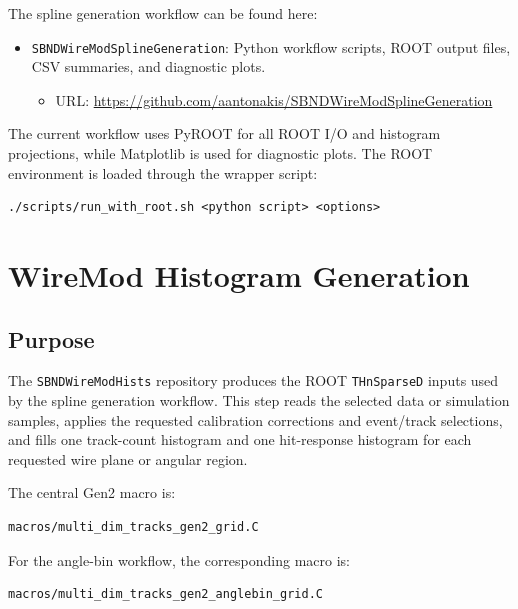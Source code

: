 \documentclass{article}
\begin{document}
The spline generation workflow can be found here:
\begin{itemize}
    \item \texttt{SBNDWireModSplineGeneration}: Python workflow scripts, ROOT output files, CSV summaries, and diagnostic plots.
    \begin{itemize}
        \item URL: \href{https://github.com/aantonakis/SBNDWireModSplineGeneration}{https://github.com/aantonakis/SBNDWireModSplineGeneration}
    \end{itemize}
\end{itemize}

The current workflow uses PyROOT for all ROOT I/O and histogram projections, while Matplotlib is used for diagnostic plots. The ROOT environment is loaded through the wrapper script:
\begin{verbatim}
./scripts/run_with_root.sh <python script> <options>
\end{verbatim}


\section{WireMod Histogram Generation}

\subsection{Purpose}

The \texttt{SBNDWireModHists} repository produces the ROOT \texttt{THnSparseD} inputs used by the spline generation workflow. This step reads the selected data or simulation samples, applies the requested calibration corrections and event/track selections, and fills one track-count histogram and one hit-response histogram for each requested wire plane or angular region.

The central Gen2 macro is:
\begin{verbatim}
macros/multi_dim_tracks_gen2_grid.C
\end{verbatim}
For the angle-bin workflow, the corresponding macro is:
\begin{verbatim}
macros/multi_dim_tracks_gen2_anglebin_grid.C
\end{verbatim}
\end{document}
